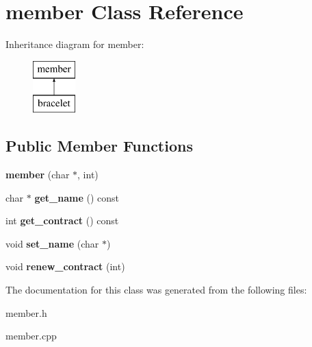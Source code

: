 \hypertarget{classmember}{\section{member Class Reference}
\label{classmember}
}
Inheritance diagram for member\-:\begin{figure}[H]
\begin{center}
\leavevmode
\includegraphics[height=2.000000cm]{classmember}
\end{center}
\end{figure}
\subsection*{Public Member Functions}
\begin{DoxyCompactItemize}
\item 
\hypertarget{classmember_a209a0e52f9163bfc398c5fb1dd990d61}{{\bfseries member} (char $\ast$, int)}\label{classmember_a209a0e52f9163bfc398c5fb1dd990d61}

\item 
\hypertarget{classmember_ae822170dd36d4e8733695ec2dabdeb33}{char $\ast$ {\bfseries get\-\_\-name} () const }\label{classmember_ae822170dd36d4e8733695ec2dabdeb33}

\item 
\hypertarget{classmember_a5e2b9da294c4c309d006e381ae459aa7}{int {\bfseries get\-\_\-contract} () const }\label{classmember_a5e2b9da294c4c309d006e381ae459aa7}

\item 
\hypertarget{classmember_ae9bc91157132af448c73d32fa69eaf71}{void {\bfseries set\-\_\-name} (char $\ast$)}\label{classmember_ae9bc91157132af448c73d32fa69eaf71}

\item 
\hypertarget{classmember_adf19ec5d197a949789ea2602b0e60849}{void {\bfseries renew\-\_\-contract} (int)}\label{classmember_adf19ec5d197a949789ea2602b0e60849}

\end{DoxyCompactItemize}


The documentation for this class was generated from the following files\-:\begin{DoxyCompactItemize}
\item 
member.\-h\item 
member.\-cpp\end{DoxyCompactItemize}
